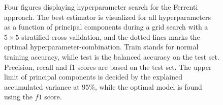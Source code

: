 \begin{figure}[ht!]
  \begin{subfigure}[b]{1.0\textwidth}
    \centering
    
  \end{subfigure}
  \par\bigskip
  \begin{subfigure}[b]{0.5\textwidth}
    
    \caption{}
    \label{fig:q1-LOG}
  \end{subfigure}%
  \hfill
  \begin{subfigure}[b]{0.5\textwidth}
    
    \caption{}
    \label{fig:q1-DT}
  \end{subfigure}

  \begin{subfigure}[b]{0.5\textwidth}
    
    \caption{}
    \label{fig:q1-RF}
  \end{subfigure}%
  \hfill
  \begin{subfigure}[b]{0.5\textwidth}
    
    \caption{}
    \label{fig:q1-GB}
  \end{subfigure}
  \vspace*{-130mm}
  \caption{{Four figures displaying hyperparameter search for the Ferrenti approach. The best estimator is visualized for all hyperparameters as a function of principal components during a grid search with a $5\times5$ stratified cross validation, and the dotted lines marks the optimal hyperparameter-combination. Train stands for normal training accuracy, while test is the balanced accuracy on the test set. Precision, recall and f1 scores are based on the test set. The upper limit of principal components is decided by the explained accumulated variance at $95\%$, while the optimal model is found using the $f1$ score.}}
  \label{fig:01-pca}
\end{figure}

